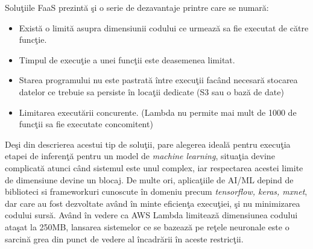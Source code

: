 \documentclass[a4paper,12pt]{report}
\begin{document}
Soluţiile FaaS prezintă şi o serie de dezavantaje printre care se numară:
\begin{itemize} 
\item Există o limită asupra dimensiunii codului ce urmează sa fie executat de către funcţie.
\item Timpul de execuţie a unei funcţii este deasemenea limitat.
\item Starea programului nu este pastrată între execuţii facând necesară stocarea datelor ce trebuie sa persiste în locaţii dedicate (S3 sau o bază de date)
\item Limitarea executării concurente. (Lambda nu permite mai mult de 1000 de funcţii sa fie executate concomitent)
\end{itemize} 
\par Deşi din descrierea acestui tip de soluţii, pare alegerea ideală pentru execuţia etapei de inferenţă pentru un model de \emph{machine learning}, situaţia devine complicată atunci când sistemul este unul complex, iar respectarea acestei limite de dimensiune devine un blocaj. De multe ori, aplicaţiile de AI/ML depind de biblioteci si frameworkuri cunoscute în domeniu precum \emph{ tensorflow, keras, mxnet}, dar care au fost dezvoltate având în minte eficienţa execuţiei, şi nu minimizarea codului sursă. Având în vedere ca AWS Lambda limitează dimensiunea codului ataşat la 250MB, lansarea sistemelor ce se bazează pe reţele neuronale este o sarcină grea din punct de vedere al încadrării în aceste restricţii. 
\end{document}
